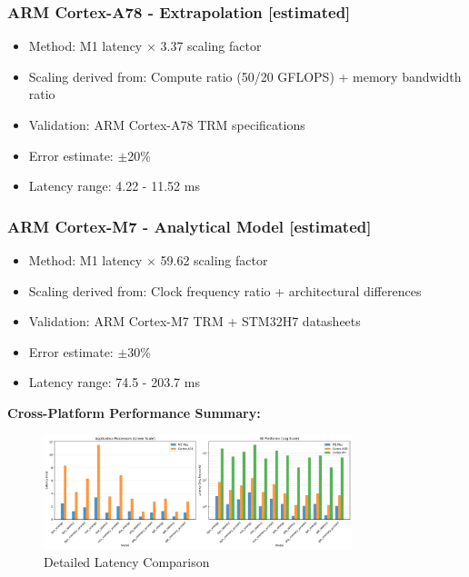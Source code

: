 \documentclass[10pt, a4paper]{article}
\begin{document}
\subsubsection{ARM Cortex-A78 - Extrapolation [estimated]}
\begin{itemize}
    \item Method: M1 latency $\times$ 3.37 scaling factor
    \item Scaling derived from: Compute ratio (50/20 GFLOPS) + memory bandwidth ratio
    \item Validation: ARM Cortex-A78 TRM specifications
    \item Error estimate: $\pm$20\%
    \item Latency range: 4.22 - 11.52 ms
\end{itemize}

\subsubsection{ARM Cortex-M7 - Analytical Model [estimated]}
\begin{itemize}
    \item Method: M1 latency $\times$ 59.62 scaling factor
    \item Scaling derived from: Clock frequency ratio + architectural differences
    \item Validation: ARM Cortex-M7 TRM + STM32H7 datasheets
    \item Error estimate: $\pm$30\%
    \item Latency range: 74.5 - 203.7 ms
\end{itemize}

\textbf{Cross-Platform Performance Summary:}

\begin{figure}[H]
\centering
\includegraphics[width=0.8\textwidth]{charts/part3_latency_detailed.png}
\caption{Detailed Latency Comparison}
\end{figure}
\end{document}
